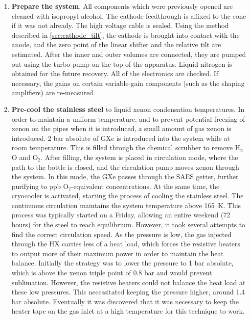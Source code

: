 \begin{enumerate}
\item \textbf{Prepare the system}.
All components which were previously opened are cleaned with isopropyl alcohol.
The cathode feedthrough is affixed to the cone if it was not already.
The high voltage cable is sealed. 
Using the method described in \ref{sec:cathode_tilt}, the cathode is brought into contact with the anode, and the zero point of the linear shifter and the relative tilt are estimated.
After the inner and outer volumes are connected, they are pumped out using the turbo pump on the top of the apparatus.
Liquid nitrogen is obtained for the future recovery.
All of the electronics are checked.
If necessary, the gains on certain variable-gain components (such as the shaping amplifiers) are re-measured.

    \item \textbf{Pre-cool the stainless steel} to liquid xenon condensation temperatures.
    In order to maintain a uniform temperature, and to prevent potential freezing of xenon on the pipes when it is introduced, a small amount of gas xenon is introduced. 
    2 bar absolute of GXe is introduced into the system while at room temperature.
    This is filled through the chemical scrubber to remove H$_2$O and O$_2$.
    After filling, the system is placed in circulation mode, where the path to the bottle is closed, and the circulation pump moves xenon through the system. 
    In this mode, the GXe passes through the SAES getter, further purifying to ppb O$_2$-equivalent concentrations.
    At the same time, the cryocooler is activated, starting the process of cooling the stainless steel.
    The continuous circulation maintains the system temperature above 165~K.
    This process was typically started on a Friday, allowing an entire weekend (72 hours) for the steel to reach equilibrium.
    However, it took several attempts to find the correct circulation speed.
    As the pressure is low, the gas injected through the HX carries less of a heat load, which forces the resistive heaters to output more of their maximum power in order to maintain the heat balance.
    Initially the strategy was to lower the pressure to 1 bar absolute, which is above the xenon triple point of 0.8 bar and would prevent sublimation.
    However, the resistive heaters could not balance the heat load at these low pressures.
    This necessitated keeping the pressure higher, around 1.4 bar absolute.
    Eventually it was discovered that it was necessary to keep the heater tape on the gas inlet at a high temperature for this technique to work.

\end{enumerate}
